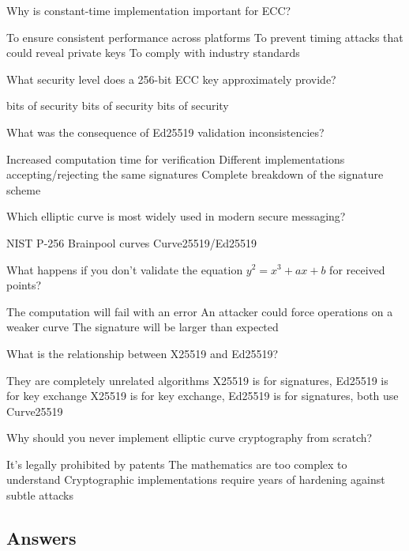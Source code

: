 \documentclass[10pt,a4paper,american]{exam}
\begin{document}
\begin{questions}
	\question Why is constant-time implementation important for ECC?
	\begin{randomizechoices}
		\choice To ensure consistent performance across platforms
		\CorrectChoice To prevent timing attacks that could reveal private keys
		\choice To comply with industry standards
	\end{randomizechoices}

	\question What security level does a 256-bit ECC key approximately provide?
	\begin{randomizechoices}
		 bits of security
		 bits of security
		 bits of security
	\end{randomizechoices}

	\question What was the consequence of Ed25519 validation inconsistencies?
	\begin{randomizechoices}
		\choice Increased computation time for verification
		\CorrectChoice Different implementations accepting/rejecting the same signatures
		\choice Complete breakdown of the signature scheme
	\end{randomizechoices}

	\question Which elliptic curve is most widely used in modern secure messaging?
	\begin{randomizechoices}
		\choice NIST P-256
		\choice Brainpool curves
		\CorrectChoice Curve25519/Ed25519
	\end{randomizechoices}

	\question What happens if you don't validate the equation $y^2 = x^3 + ax + b$ for received points?
	\begin{randomizechoices}
		\choice The computation will fail with an error
		\CorrectChoice An attacker could force operations on a weaker curve
		\choice The signature will be larger than expected
	\end{randomizechoices}

	\question What is the relationship between X25519 and Ed25519?
	\begin{randomizechoices}
		\choice They are completely unrelated algorithms
		\choice X25519 is for signatures, Ed25519 is for key exchange
		\CorrectChoice X25519 is for key exchange, Ed25519 is for signatures, both use Curve25519
	\end{randomizechoices}

	\question Why should you never implement elliptic curve cryptography from scratch?
	\begin{randomizechoices}
		\choice It's legally prohibited by patents
		\choice The mathematics are too complex to understand
		\CorrectChoice Cryptographic implementations require years of hardening against subtle attacks
	\end{randomizechoices}

\end{questions}

\clearpage

\subsection*{Answers}
\printkeytable
\end{document}
